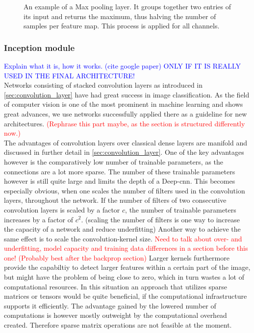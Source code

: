 \begin{figure}
\centering

\caption[Max Pooling layer]{An example of a Max pooling layer. It groups together two entries of its input and returns the maximum, thus halving the number of samples per feature map. This process is applied for all channels.}\label{fig:max_pooling}
\end{figure}

\subsubsection{Inception module}\label{sec:inception_module}
\textcolor{blue}{Explain what it is, how it works. (cite google paper) ONLY IF IT IS REALLY USED IN THE FINAL ARCHITECTURE!}\\
Networks consisting of stacked convolution layers as introduced in \autoref{sec:convolution_layer} have had great success in image classification. \cite{deep_learning_book, alex_net, ILSVRC15} As the field of computer vision is one of the most prominent in machine learning and shows great advances, we use networks successfully applied there as a guideline for new architectures. \textcolor{red}{(Rephrase this part maybe, as the section is structured differently now.)}\\
The advantages of convolution layers over classical dense layers are manifold and discussed in further detail in \autoref{sec:convolution_layer}. One of the key advantages however is the comparatively low number of trainable parameters, as the connections are a lot more sparse. The number of these trainable parameters however is still quite large and limits the depth of a Deep-\gls{cnn}. This becomes especially obvious, when one scales the number of filters used in the convolution layers, throughout the network. If the number of filters of two consecutive convolution layers is scaled by a factor $c$, the number of trainable parameters increases by a factor of $c^2$. (scaling the number of filters is one way to increase the capacity of a network and reduce underfitting) \cite{inception_module} Another way to achieve the same effect is to scale the convolution-kernel size. \textcolor{red}{Need to talk about over- and underfitting, model capacity and training data differences in a section before this one! (Probably best after the backprop section)} Larger kernels furthermore provide the capabiltiy to detect larger features within a certain part of the image, but might have the problem of being close to zero, which in turn wastes a lot of computational resources. In this situation an approach that utilizes sparse matrices or tensors would be quite beneficial, if the computational infrastructure supports it efficiently. The advantage gained by the lowered number of computations is however mostly outweight by the computational overhead created. Therefore sparse matrix operations are not feasible at the moment. \cite{inception_module}\\

